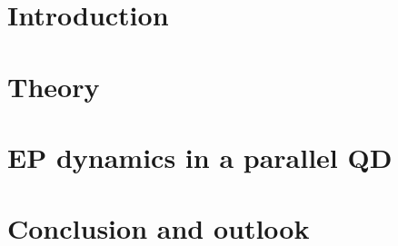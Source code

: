 \documentclass[12pt, twoside]{report}
\begin{document}

\newpage
{}

\newpage
{
    \hypersetup{linkcolor=black}
    \tableofcontents
}
\newpage
{}
\chapter{Introduction}

\chapter{Theory}\label{sec:theory}

\chapter{EP dynamics in a parallel QD}


\chapter{Conclusion and outlook}\label{sec:conc}


\newpage
\printbibliography
\appendix
\end{document}

